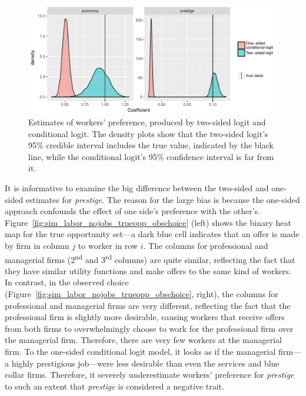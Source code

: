 \begin{figure}[tbp]
  \centering
  \includegraphics[width=\textwidth,keepaspectratio]{../figure/sim_labor_nojobs_alpha_tsl_vs_cl}
  \caption[Comparing two-sided logit's and one-sided
  conditional logit's estimates.]{Estimates of workers' preference, produced by
    two-sided logit and conditional logit. The density plots show that the
    two-sided logit's 95\% credible interval includes the true value, indicated
    by the black line, while the conditional logit's 95\% confidence interval is
    far from it.}
  \label{fig:sim_labor_nojobs_alpha_tsl_vs_cl}
\end{figure}

It is informative to examine the big difference between the two-sided and
one-sided estimates for \textit{prestige}. The reason for the large bias is
because the one-sided approach confounds the effect of one side's preference
with the other's. Figure~\ref{fig:sim_labor_nojobs_trueopp_obschoice} (left)
shows the binary heat map for the true opportunity set---a dark blue cell
indicates that an offer is made by firm in column $j$ to worker in row $i$. The
columns for professional and managerial firms (2\textsuperscript{nd} and
3\textsuperscript{rd} columns) are quite similar, reflecting the fact that they
have similar utility functions and make offers to the same kind of workers. In
contrast, in the observed choice
(Figure~\ref{fig:sim_labor_nojobs_trueopp_obschoice}, right), the columns for
professional and managerial firms are very different, reflecting the fact that
the professional firm is slightly more desirable, causing workers that receive
offers from both firms to overwhelmingly choose to work for the professional
firm over the managerial firm. Therefore, there are very few workers at the
managerial firm. To the one-sided conditional logit model, it looks as if the
managerial firm---a highly prestigious job---were less desirable than even the
services and blue collar firms. Therefore, it severely underestimate workers'
preference for \textit{prestige} to such an extent that \textit{prestige} is
considered a negative trait.

